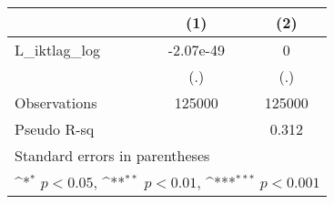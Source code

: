 {
\def\sym#1{\ifmmode^{#1}\else\(^{#1}\)\fi}
\begin{tabular}{l*{2}{c}}
\hline\hline
          &\multicolumn{1}{c}{(1)}         &\multicolumn{1}{c}{(2)}         \\
\hline
L\_iktlag\_log&-2.07e-49         &        0         \\
          &      (.)         &      (.)         \\
\hline
Observations&   125000         &   125000         \\
Pseudo R-sq&                  &    0.312         \\
\hline\hline
\multicolumn{3}{l}{\footnotesize Standard errors in parentheses}\\
\multicolumn{3}{l}{\footnotesize \sym{*} \(p<0.05\), \sym{**} \(p<0.01\), \sym{***} \(p<0.001\)}\\
\end{tabular}
}
